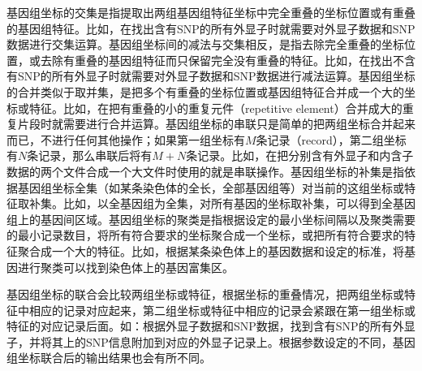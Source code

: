 基因组坐标的交集是指提取出两组基因组特征坐标中完全重叠的坐标位置或有重叠的基因组特征。比如，在找出含有SNP的所有外显子时就需要对外显子数据和SNP数据进行交集运算。基因组坐标间的减法与交集相反，是指去除完全重叠的坐标位置，或去除有重叠的基因组特征而只保留完全没有重叠的特征。比如，在找出不含有SNP的所有外显子时就需要对外显子数据和SNP数据进行减法运算。基因组坐标的合并类似于取并集，是把多个有重叠的坐标位置或基因组特征合并成一个大的坐标或特征。比如，在把有重叠的小的重复元件（repetitive element）合并成大的重复片段时就需要进行合并运算。基因组坐标的串联只是简单的把两组坐标合并起来而已，不进行任何其他操作；如果第一组坐标有$M$条记录（record），第二组坐标有$N$条记录，那么串联后将有$M+N$条记录。比如，在把分别含有外显子和内含子数据的两个文件合成一个大文件时使用的就是串联操作。基因组坐标的补集是指依据基因组坐标全集（如某条染色体的全长，全部基因组等）对当前的这组坐标或特征取补集。比如，以全基因组为全集，对所有基因的坐标取补集，可以得到全基因组上的基因间区域。基因组坐标的聚类是指根据设定的最小坐标间隔以及聚类需要的最小记录数目，将所有符合要求的坐标聚合成一个坐标，或把所有符合要求的特征聚合成一个大的特征。比如，根据某条染色体上的基因数据和设定的标准，将基因进行聚类可以找到染色体上的基因富集区。

基因组坐标的联合会比较两组坐标或特征，根据坐标的重叠情况，把两组坐标或特征中相应的记录对应起来，第二组坐标或特征中相应的记录会紧跟在第一组坐标或特征的对应记录后面。如：根据外显子数据和SNP数据，找到含有SNP的所有外显子，并将其上的SNP信息附加到对应的外显子记录上。根据参数设定的不同，基因组坐标联合后的输出结果也会有所不同。

